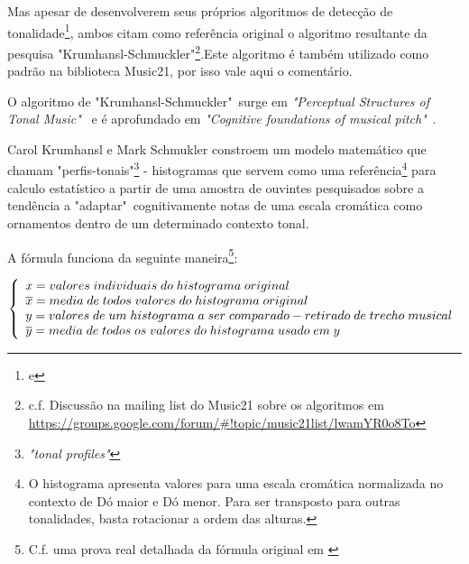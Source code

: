 \documentclass[
	12pt,				%
	openright,			%
	twoside,			%
	a4paper,			%
	english,			%
	french,				%
	spanish,			%
	brazil				%
	]{abntex2}
\begin{document}
Mas apesar de desenvolverem seus próprios algoritmos de detecção de tonalidade\footnote{\cite[ p.173]{temperley2001cognition} e }, ambos citam como referência original o algoritmo resultante da pesquisa "Krumhansl-Schmuckler"\footnote{c.f. Discussão na mailing list do Music21 sobre os algoritmos em \url{https://groups.google.com/forum/\#!topic/music21list/lwamYR0o8To}}.Este algoritmo é também utilizado como padrão na biblioteca Music21, por isso vale aqui o comentário.

O algoritmo de "Krumhansl-Schmuckler"\ surge em \textit{"Perceptual Structures of Tonal Music"}\ \cite{krumhansl1983perceptual} e é aprofundado em \textit{"Cognitive foundations of musical pitch"}\ \cite{krumhansl1990cognitive}.

Carol Krumhansl e Mark Schmukler constroem um modelo matemático que chamam "perfis-tonais"\footnote{\textit{"tonal profiles"}} - histogramas que servem como uma referência\footnote{O histograma apresenta valores para uma escala cromática normalizada no contexto de Dó maior e Dó menor. Para ser transposto para outras tonalidades, basta rotacionar a ordem das alturas.} para calculo estatístico a partir de uma amostra de ouvintes pesquisados sobre a tendência a "adaptar"\ cognitivamente \cite[ p. 173]{temperley2001cognition} notas de uma escala cromática como ornamentos dentro de um determinado contexto tonal.

A fórmula funciona da seguinte maneira\footnote{C.f. uma prova real detalhada da fórmula original em \cite[p.37]{krumhansl1990cognitive} }:



$ \left\{
  \begin{array}{l l}
x = valores\;individuais\;do\;histograma\;original \\
\overline{x} = media\;de\;todos\;valores\;do\;histograma\;original \\
y = valores\;de\;um\;histograma\;a\;ser\;comparado - retirado\;de\;trecho\;musical \\
\overline{y} = media\;de\;todos\;os\;valores\;do\;histograma\;usado\;em\;y \\
    
  \end{array} \right.
$
\end{document}
